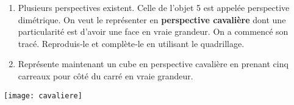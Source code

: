 \begin{activite}
\begin{partie}
\begin{minipage}[c]{0.58\linewidth}
\begin{enumerate}
 \item Plusieurs perspectives existent. Celle de l'objet 5 est appelée perspective dimétrique. On veut le représenter en \textbf{perspective cavalière} dont une particularité est d'avoir une face en vraie grandeur. On a commencé son tracé. Reproduis‑le et complète‑le en utilisant le quadrillage.
 \item Représente maintenant un cube en perspective cavalière en prenant cinq carreaux pour côté du carré en vraie grandeur. 
 \end{enumerate}
 \end{minipage} \hfill%
 \begin{minipage}[t]{0.38\linewidth}
  \texttt{[image: cavaliere]}
  \end{minipage} \\
\end{partie}

\end{activite}


